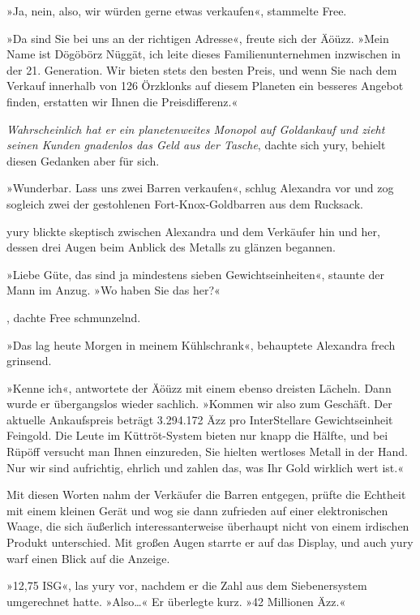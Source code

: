 »Ja, nein, also, wir würden gerne etwas verkaufen«, stammelte Free.

»Da sind Sie bei uns an der richtigen Adresse«, freute sich der Äöüzz. »Mein Name ist Dögöbörz Nüggät, ich leite dieses Familienunternehmen inzwischen in der 21. Generation. Wir bieten stets den besten Preis, und wenn Sie nach dem Verkauf innerhalb von 126 Örzklonks auf diesem Planeten ein besseres Angebot finden, erstatten wir Ihnen die Preisdifferenz.«

\textit{Wahrscheinlich hat er ein planetenweites Monopol auf Goldankauf und zieht seinen Kunden gnadenlos das Geld aus der Tasche}, dachte sich yury, behielt diesen Gedanken aber für sich.

»Wunderbar. Lass uns zwei Barren verkaufen«, schlug Alexandra vor und zog sogleich zwei der gestohlenen Fort-Knox-Goldbarren aus dem Rucksack.

yury blickte skeptisch zwischen Alexandra und dem Verkäufer hin und her, dessen drei Augen beim Anblick des Metalls zu glänzen begannen.

»Liebe Güte, das sind ja mindestens sieben Gewichtseinheiten«, staunte der Mann im Anzug. »Wo haben Sie das her?«

, dachte Free schmunzelnd. 

»Das lag heute Morgen in meinem Kühlschrank«, behauptete Alexandra frech grinsend.

»Kenne ich«, antwortete der Äöüzz mit einem ebenso dreisten Lächeln. Dann wurde er übergangslos wieder sachlich. »Kommen wir also zum Geschäft. Der aktuelle Ankaufspreis beträgt 3.294.172 Äzz pro InterStellare Gewichtseinheit Feingold. Die Leute im Küttröt-System bieten nur knapp die Hälfte, und bei Rüpöff versucht man Ihnen einzureden, Sie hielten wertloses Metall in der Hand. Nur wir sind aufrichtig, ehrlich und zahlen das, was Ihr Gold wirklich wert ist.«

Mit diesen Worten nahm der Verkäufer die Barren entgegen, prüfte die Echtheit mit einem kleinen Gerät und wog sie dann zufrieden auf einer elektronischen Waage, die sich äußerlich interessanterweise überhaupt nicht von einem irdischen Produkt unterschied. Mit großen Augen starrte er auf das Display, und auch yury warf einen Blick auf die Anzeige.

»12,75 ISG«, las yury vor, nachdem er die Zahl aus dem Siebenersystem umgerechnet hatte. »Also…« Er überlegte kurz. »42 Millionen Äzz.«

